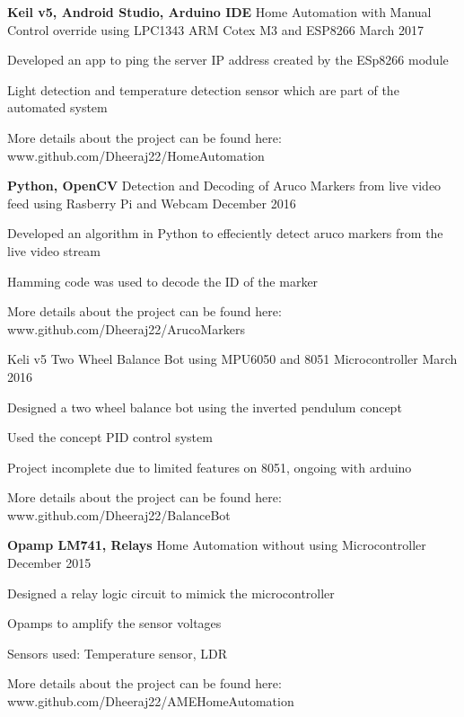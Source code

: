 \begin{cventries}
  \cventry
    {\textbf{Keil v5, Android Studio, Arduino IDE}}
    {Home Automation with Manual Control override using LPC1343 ARM Cotex M3 and ESP8266}
   {}
    {March 2017}
    {
      \begin{cvitems}
        \item {Developed an app to ping the server IP address created by the ESp8266 module}
         \item {Light detection and temperature detection sensor which are part of the automated system}
         \item {More details about the project can be found here: \textcolor{awesome-emerald}{www.github.com/Dheeraj22/HomeAutomation}}
      \end{cvitems}
    }
     \cventry
    {\textbf{Python, OpenCV}}
    {Detection and Decoding of Aruco Markers from live video feed using Rasberry Pi and Webcam}
    {}
    {December 2016}
    {
      \begin{cvitems}
        \item {Developed an algorithm in Python to effeciently detect aruco markers from the live video stream}
         \item {Hamming code was used to decode the ID of the marker}
         \item {More details about the project can be found here: \textcolor{awesome-emerald}{www.github.com/Dheeraj22/ArucoMarkers}}
      \end{cvitems}
    }
     \cventry
    {Keli v5}
    {Two Wheel Balance Bot using MPU6050 and 8051 Microcontroller}
    {}
    {March 2016}
    {
      \begin{cvitems}
        \item {Designed a two wheel balance bot using the inverted pendulum concept}
         \item {Used the concept PID control system}
         \item {Project incomplete due to limited features on 8051, ongoing with arduino}
         \item {More details about the project can be found here: \textcolor{awesome-emerald}{www.github.com/Dheeraj22/BalanceBot}}
      \end{cvitems}
    }
    \cventry
    {\textbf{Opamp LM741, Relays}}
    {Home Automation without using Microcontroller}
    {}
    {December 2015}
    {
      \begin{cvitems}
        \item {Designed a relay logic circuit to mimick the microcontroller}
         \item {Opamps to amplify the sensor voltages}
         \item {Sensors used: Temperature sensor, LDR}
         \item {More details about the project can be found here: \textcolor{awesome-emerald}{www.github.com/Dheeraj22/AMEHomeAutomation}}
      \end{cvitems}
    }
\end{cventries}
